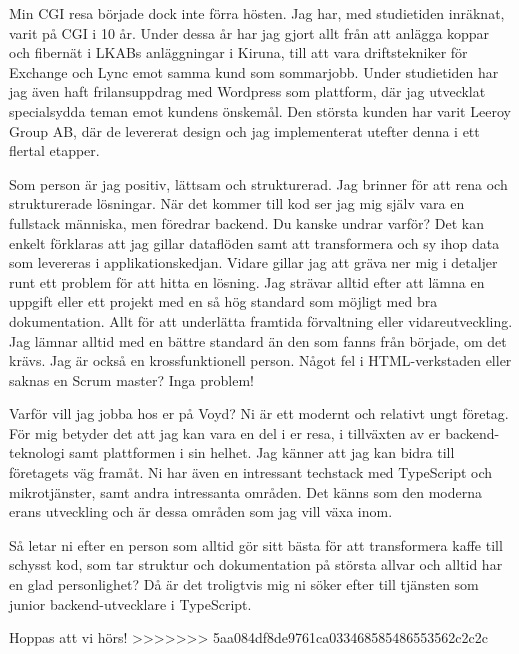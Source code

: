 \bigskip

Min CGI resa började dock inte förra hösten. 
Jag har, med studietiden inräknat, varit på CGI i 10 år.
Under dessa år har jag gjort allt från att anlägga koppar och fibernät i LKABs anläggningar i Kiruna, till att vara driftstekniker för Exchange och Lync emot samma kund som sommarjobb.
Under studietiden har jag även haft frilansuppdrag med Wordpress som plattform, där jag utvecklat specialsydda teman emot kundens önskemål.
Den största kunden har varit Leeroy Group AB, där de levererat design och jag implementerat utefter denna i ett flertal etapper.

\bigskip

Som person är jag positiv, lättsam och strukturerad. 
Jag brinner för att rena och strukturerade lösningar.
När det kommer till kod ser jag mig själv vara en fullstack människa, men föredrar backend.
Du kanske undrar varför?
Det kan enkelt förklaras att jag gillar dataflöden samt att transformera och sy ihop data som levereras i applikationskedjan.
Vidare gillar jag att gräva ner mig i detaljer runt ett problem för att hitta en lösning.
Jag strävar alltid efter att lämna en uppgift eller ett projekt med en så hög standard som möjligt med bra dokumentation.
Allt för att underlätta framtida förvaltning eller vidareutveckling.
Jag lämnar alltid med en bättre standard än den som fanns från började, om det krävs.
Jag är också en krossfunktionell person.
Något fel i HTML-verkstaden eller saknas en Scrum master?
Inga problem!

\bigskip

Varför vill jag jobba hos er på Voyd?
Ni är ett modernt och relativt ungt företag.
För mig betyder det att jag kan vara en del i er resa, i tillväxten av er backend-teknologi samt plattformen i sin helhet.
Jag känner att jag kan bidra till företagets väg framåt.
Ni har även en intressant techstack med TypeScript och mikrotjänster, samt andra intressanta områden.
Det känns som den moderna erans utveckling och är dessa områden som jag vill växa inom.

\bigskip

Så letar ni efter en person som alltid gör sitt bästa för att transformera kaffe till schysst kod,
som tar struktur och dokumentation på största allvar och alltid har en glad personlighet?
Då är det troligtvis mig ni söker efter till tjänsten som junior backend-utvecklare i TypeScript.

Hoppas att vi hörs!
>>>>>>> 5aa084df8de9761ca033468585486553562c2c2c

